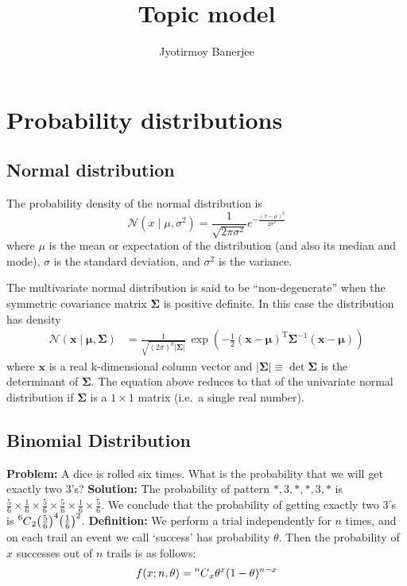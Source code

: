 \documentclass{article}
\title{Topic model}
\author{Jyotirmoy Banerjee}
\newcommand\Mycomb[2][^n]{\prescript{#1\mkern-0.5mu}{}C_{#2}}
\begin{document}
\maketitle


\section{Probability distributions}
\subsection{Normal distribution}
The probability density of the normal distribution is
\[\displaystyle \mathcal{N}(x\mid \mu ,\sigma ^{2})={\frac {1}{\sqrt {2\pi \sigma ^{2}}}}e^{-{\frac {(x-\mu )^{2}}{2\sigma ^{2}}}}\]
where $\mu$ is the mean or expectation of the distribution (and also its median and mode), $\sigma$ is the standard deviation, and $\sigma^{2}$ is the variance.

The multivariate normal distribution is said to be ``non-degenerate'' when the symmetric covariance matrix $\boldsymbol {\Sigma }$ is positive definite. In this case the distribution has density
\begin{align*}
\mathcal{N}(\mathbf {x} \mid \boldsymbol {\mu }, \boldsymbol {\Sigma })&={\frac{1}{\sqrt {(2\pi )^{k}|{\boldsymbol {\Sigma }}|}} \, {\exp \left(-{\frac {1}{2}}({\mathbf {x} }-{\boldsymbol {\mu }})^{\mathrm {T} }{\boldsymbol {\Sigma }}^{-1}({\mathbf {x} }-{\boldsymbol {\mu }})\right)}}
\end{align*}
where $\mathbf {x}$ is a real k-dimensional column vector and $|{\boldsymbol {\Sigma }}|\equiv \operatorname {det} {\boldsymbol {\Sigma }}$ is the determinant of ${\boldsymbol {\Sigma }}$. 
The equation above reduces to that of the univariate normal distribution if ${\boldsymbol {\Sigma }}$ is a $1\times 1$ matrix (i.e.\ a single real number). 

\subsection{Binomial Distribution}
\textbf{Problem:} A dice is rolled six times. What is the probability that we will get exactly two 3's? \newline
\textbf{Solution:} The probability of pattern $*,3,*,*,3,*$ is $\frac{5}{6}\times\frac{1}{6}\times\frac{5}{6}\times\frac{5}{6}\times\frac{1}{6}\times\frac{5}{6}$. We conclude that the probability of getting exactly two 3's is $\Mycomb[6]{2}\big(\frac{5}{6}\big)^4\big(\frac{1}{6}\big)^2$. \newline
\textbf{Definition:} We perform a trial independently for $n$ times, and on each trail an event we call `success' has probability $\theta$. Then the probability of $x$ successes out of $n$ trails is as follows:
\[f(x;n,\theta) = \Mycomb[n]{x}{\theta}^x(1-{\theta})^{n-x}\]
\end{document}
